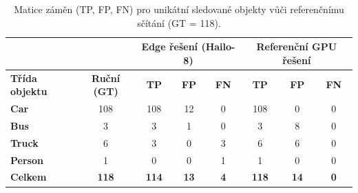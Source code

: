 \documentclass[male,czech,api_bc]{kitheses}
\renewcommand{\arraystretch}{1.23}
\begin{document}
\begin{table}[H]
    \centering
    \small\renewcommand{\arraystretch}{1.2}
    \setlength{\tabcolsep}{4pt}
    \begin{tabular}{|l|c||c|c|c||c|c|c|}
        \hline
         & & \multicolumn{3}{c||}{\textbf{Edge řešení (Hailo-8)}} & \multicolumn{3}{c|}{\textbf{Referenční GPU řešení}} \\ \hline
        \textbf{Třída objektu} & \textbf{Ruční (GT)} & \textbf{TP} & \textbf{FP} & \textbf{FN} & \textbf{TP} & \textbf{FP} & \textbf{FN} \\ \hline
        \textbf{Car} & 108 & 108 & 12 & 0 & 108 & 0 & 0 \\ \hline
        \textbf{Bus} & 3 & 3 & 1 & 0 & 3 & 8 & 0 \\ \hline
        \textbf{Truck} & 6 & 3 & 0 & 3 & 6 & 6 & 0 \\ \hline
        \textbf{Person} & 1 & 0 & 0 & 1 & 1 & 0 & 0 \\ \hline \hline
        \textbf{Celkem} & \textbf{118} & \textbf{114} & \textbf{13} & \textbf{4} & \textbf{118} & \textbf{14} & \textbf{0} \\ \hline
    \end{tabular}
    \caption{Matice záměn (TP, FP, FN) pro unikátní sledované objekty vůči referenčnímu sčítání (GT = 118).}
    \label{tab:confusion_matrix}
\end{table}
\end{document}
